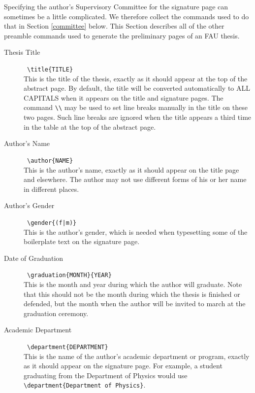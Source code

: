 \documentclass[11pt]{article}
\begin{document}
Specifying the author's Supervisory Committee for the signature page can sometimes be a little complicated.  We therefore collect the commands used to do that in Section \ref{committee} below.  This Section describes all of the other preamble commands used to generate the preliminary pages of an FAU thesis.
%
\begin{description}

\item[Thesis Title] \dotfill\ \verb=\title{TITLE}=\\
This is the title of the thesis, exactly as it should appear at the top of the abstract page.  By default, the title will be converted automatically to ALL CAPITALS when it appears on the title and signature pages.  The command \verb=\\= may be used to set line breaks manually in the title on these two pages.  Such line breaks are ignored when the title appears a third time in the table at the top of the abstract page.

\item[Author's Name] \dotfill\ \verb=\author{NAME}=\\
This is the author's name, exactly as it should appear on the title page and elsewhere.  The author may not use different forms of his or her name in different places.

\item[Author's Gender] \dotfill\ \verb=\gender{(f|m)}=\\
This is the author's gender, which is needed when typesetting some of the boilerplate text on the signature page.

\item[Date of Graduation] \dotfill\ \verb=\graduation{MONTH}{YEAR}=\\
This is the month and year during which the author will graduate.  Note that this should not be the month during which the thesis is finished or defended, but the month when the author will be invited to march at the graduation ceremony.

\item[Academic Department] \dotfill\ \verb=\department{DEPARTMENT}=\\
This is the name of the author's academic department or program, exactly as it should appear on the signature page.  For example, a student graduating from the Department of Physics would use \verb=\department{Department of Physics}=.


\end{description}
\end{document}
